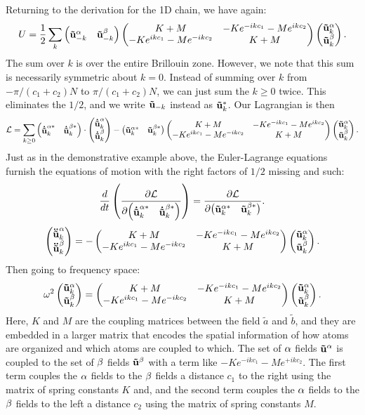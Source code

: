 \documentclass[12pt]{article}
\begin{document}
Returning to the derivation for the 1D chain, we have again:
\[ U = \frac{1}{2} \sum_k \left(\begin{matrix} \mathbf{\tilde u}^\alpha_{-k} & \mathbf{\tilde u}^\beta_{-k}\end{matrix}\right) 
\left(\begin{matrix} K + M & - K e^{-ikc_1} - Me^{ikc_2} \\ - Ke^{ikc_1} - Me^{-ikc_2} & 
K+M\end{matrix}\right) \left(\begin{matrix} \mathbf{\tilde u}^\alpha_k \\ \mathbf{\tilde u}^\beta_k \end{matrix}\right).\]
The sum over $k$ is over the entire Brillouin zone. However, we note that this 
sum is necessarily symmetric about $k=0$. Instead of summing over $k$ from 
$-\pi/(c_1+c_2)N$ to $\pi/(c_1+c_2)N$, we can just sum the $k\geq0$ twice. This 
eliminates the $1/2$, and we write $\mathbf{\tilde u}_{-k}$ instead as $\mathbf{\tilde
u}_{k}^*$. Our Lagrangian is then
\[ \mathcal{L} = \sum_{k\geq 0} \left(\begin{matrix} \mathbf{\dot{\tilde u}}^{\alpha *}_{k} & 
\mathbf{\dot{\tilde u}}^{\beta *}_{k}\end{matrix}\right) \cdot \left(\begin{matrix} \mathbf{\dot{\tilde u}}^\alpha_k \\ 
\mathbf{\dot{\tilde u}}^\beta_k \end{matrix}\right) - 
\left(\begin{matrix} \mathbf{\tilde u}^{\alpha *}_{k} & \mathbf{\tilde 
u}^{\beta *}_{k}\end{matrix}\right) \left(\begin{matrix} K + M & - K e^{-ikc_1} - Me^{ikc_2} \\ - Ke^{ikc_1} - 
Me^{-ikc_2} & K+M\end{matrix}\right) \left(\begin{matrix} \mathbf{\tilde u}^\alpha_k \\ \mathbf{\tilde u}^\beta_k \end{matrix}\right).\]
Just as in the demonstrative example above, the Euler-Lagrange equations 
furnish the equations of motion with the right factors of $1/2$ missing and 
such:
\[ \frac{d {}}{d {t}} \left( \frac{\partial {\mathcal{L}}}{\partial {\left(\begin{matrix} \mathbf{\dot{\tilde u}}^{\alpha*}_{k} 
& 
\mathbf{\dot{\tilde u}}^{\beta*}_{k}\end{matrix}\right) }} \right) = \frac{\partial {\mathcal{L}}}{\partial { \left(\begin{matrix} \mathbf{\tilde 
u}^{\alpha*}_{k} & \mathbf{\tilde 
u}^{\beta*}_{k}\end{matrix}\right) }}.\]
\[ \left(\begin{matrix} \mathbf{\ddot{\tilde u}}^\alpha_k \\ \mathbf{\ddot{\tilde u}}^\beta_k \end{matrix}\right) = -\left(\begin{matrix} 
K + M & - K e^{-ikc_1} - Me^{ikc_2} \\ - Ke^{ikc_1} - 
Me^{-ikc_2} & K+M\end{matrix}\right) \left(\begin{matrix} \mathbf{\tilde u}^\alpha_k \\ \mathbf{\tilde u}^\beta_k \end{matrix}\right).\]
Then going to frequency space:
\[ \omega^2 \left(\begin{matrix} \mathbf{\tilde u}^\alpha_k \\ \mathbf{\tilde u}^\beta_k \end{matrix}\right) = 
\left(\begin{matrix} 
K + M & - K e^{-ikc_1} - Me^{ikc_2} \\ - Ke^{ikc_1} - 
Me^{-ikc_2} & K+M\end{matrix}\right) \left(\begin{matrix} \mathbf{\tilde u}^\alpha_k \\ \mathbf{\tilde u}^\beta_k \end{matrix}\right).\]
Here, $K$ and $M$ are the coupling matrices between the field $\tilde a$ and 
$\tilde b$, and they are embedded in a larger matrix that encodes the spatial 
information of how atoms are organized and which atoms are coupled to which. 
The set of $\alpha$ fields $\mathbf{\tilde u}^\alpha$ is coupled to the set of $\beta$ 
fields $\mathbf{\tilde u}^\beta$ with a term like $-K e^{-ikc_1} -M e^{+ikc_2}$. 
The first term couples the $\alpha$ fields to the $\beta$ fields a 
distance $c_1$ to the right using the matrix of spring constants $K$ and, and 
the second term couples the $\alpha$ fields to the $\beta$ fields to the left a 
distance $c_2$ using the matrix of spring constants $M$.
\end{document}
